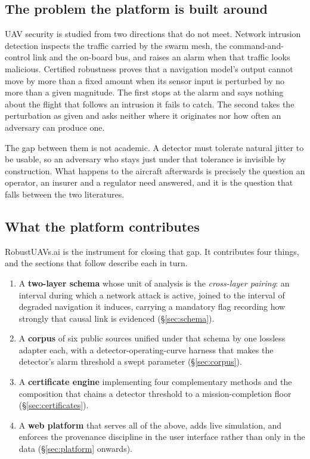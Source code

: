 \documentclass[11pt,a4paper]{article}
\begin{document}
\subsection{The problem the platform is built around}
UAV security is studied from two directions that do not meet. Network intrusion
detection inspects the traffic carried by the swarm mesh, the command-and-control
link and the on-board bus, and raises an alarm when that traffic looks
malicious. Certified robustness proves that a navigation model's output cannot
move by more than a fixed amount when its sensor input is perturbed by no more
than a given magnitude. The first stops at the alarm and says nothing about the
flight that follows an intrusion it fails to catch. The second takes the
perturbation as given and asks neither where it originates nor how often an
adversary can produce one.

The gap between them is not academic. A detector must tolerate natural jitter to
be usable, so an adversary who stays just under that tolerance is invisible by
construction. What happens to the aircraft afterwards is precisely the question
an operator, an insurer and a regulator need answered, and it is the question
that falls between the two literatures.

\subsection{What the platform contributes}
RobustUAVs.ai is the instrument for closing that gap. It contributes four
things, and the sections that follow describe each in turn.

\begin{enumerate}[leftmargin=1.6em]
\item A \textbf{two-layer schema} whose unit of analysis is the
\emph{cross-layer pairing}: an interval during which a network attack is active,
joined to the interval of degraded navigation it induces, carrying a mandatory
flag recording how strongly that causal link is evidenced
(\S\ref{sec:schema}).
\item A \textbf{corpus} of six public sources unified under that schema by one
lossless adapter each, with a detector-operating-curve harness that makes the
detector's alarm threshold a swept parameter (\S\ref{sec:corpus}).
\item A \textbf{certificate engine} implementing four complementary methods and
the composition that chains a detector threshold to a mission-completion floor
(\S\ref{sec:certificates}).
\item A \textbf{web platform} that serves all of the above, adds live
simulation, and enforces the provenance discipline in the user interface rather
than only in the data (\S\ref{sec:platform} onwards).
\end{enumerate}
\end{document}
